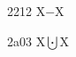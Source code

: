 \documentclass[11pt]{article}
\begin{document}
2212 X{\ensuremath{\minus}}X

2a03 X{\ensuremath{\bigcupdot}}X
\end{document}
